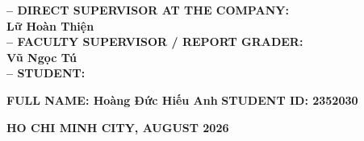 \begin{titlepage}
\begin{center}
\begin{minipage}{0.82\textwidth}
\textbf{-- DIRECT SUPERVISOR AT THE COMPANY:}\\[0.08cm]
\hspace*{0.45cm}\textbf{Lữ Hoàn Thiện}\\[0.2cm]

\textbf{-- FACULTY SUPERVISOR / REPORT GRADER:}\\[0.08cm]
\hspace*{0.45cm}\textbf{Vũ Ngọc Tú}\\[0.2cm]

\textbf{-- STUDENT:}\\[0.08cm]
{\fontsize{14}{17}\selectfont
\textbf{FULL NAME: Hoàng Đức Hiếu Anh}\hfill
\textbf{STUDENT ID: 2352030}\par}
\end{minipage}
\end{center}

\vfill
\begin{center}
{\fontsize{15}{18}\selectfont\bfseries
HO CHI MINH CITY, AUGUST 2026}
\end{center}
\end{titlepage}
